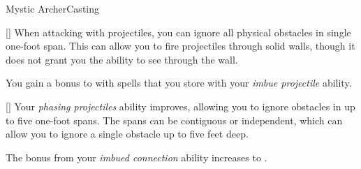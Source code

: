 \begin{feat}{Mystic Archer}{Casting}

        [] When attacking with projectiles, you can ignore all physical obstacles in single one-foot span.
        This can allow you to fire projectiles through solid walls, though it does not grant you the ability to see through the wall.

         You gain a  bonus to  with spells that you store with your \textit{imbue projectile} ability.

        [] Your \textit{phasing projectiles} ability improves, allowing you to ignore obstacles in up to five one-foot spans.
        The spans can be contiguous or independent, which can allow you to ignore a single obstacle up to five feet deep.

         The bonus from your \textit{imbued connection} ability increases to .
    \end{feat}

